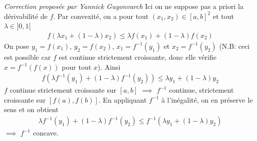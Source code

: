 \documentclass{report}
\begin{document}
\subsection{} \noindent{}\\ 
\\ 
\\
\noindent 
\null \hfill \textit{Correction proposée par Yannick Guyonvarch}\newline
Ici on ne suppose pas a priori la dérivabilité de $f$.
\newline
Par convexité, on a pour tout $(x_1,x_2)\in[a,b]^2$ et tout $\lambda\in]0,1[$
\begin{align*}
    f(\lambda x_1+(1-\lambda)x_2)\leq \lambda f(x_1)+(1-\lambda)f(x_2)
\end{align*}
On pose $y_1=f(x_1)$, $y_2=f(x_2)$, $x_1=f^{-1}(y_1)$ et $x_2=f^{-1}(y_2)$ (N.B: ceci est possible car $f$ est continue strictement croissante, donc elle vérifie $x=f^{-1}(f(x))$ pour tout $x$).
\newline
Ainsi
\begin{align*}
    f(\lambda f^{-1}(y_1)+(1-\lambda)f^{-1}(y_2))\leq \lambda y_1+(1-\lambda)y_2
\end{align*}
$f$ continue strictement croissante sur $[a,b]$ $\implies$ $f^{-1}$ continue, strictement croissante sur $[f(a),f(b)]$. En appliquant $f^{-1}$ à l'inégalité, on en préserve le sens et on obtient
\begin{align*}
    \lambda f^{-1}(y_1)+(1-\lambda)f^{-1}(y_2)\leq f^{-1}(\lambda y_1+(1-\lambda)y_2)
\end{align*}
$\implies$ $f^{-1}$ concave.
\end{document}
